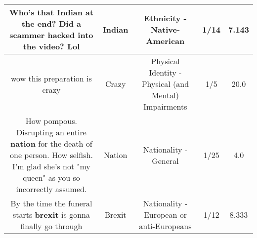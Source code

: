 \documentclass[11pt]{article}
\newlength\mylength
\begin{document}
\begin{center}
\begin{longtable}{|C{.65\mylength}|C{.30\mylength}|C{.12\mylength}|C{.12\mylength}|C{.12\mylength}|}
  \small Who's that \textbf{Indian} at the end? Did a scammer hacked into the video? Lol\normalsize   & Indian & Ethnicity - Native-American & 1/14 & 7.143 \\  \hline
  \small wow this preparation is crazy\normalsize   & Crazy & Physical Identity - Physical (and Mental) Impairments & 1/5 & 20.0 \\  \hline
  \small How pompous. Disrupting an entire \textbf{nation} for the death of one person. How selfish. I'm glad she's  not "my queen" as you so incorrectly assumed.\normalsize   & Nation & Nationality - General & 1/25 & 4.0 \\  \hline
  \small By the time the funeral starts \textbf{brexit} is gonna finally go through\normalsize   & Brexit & Nationality - European or anti-Europeans & 1/12 & 8.333 \\  \hline

\end{longtable}
\end{center}
\end{document}
